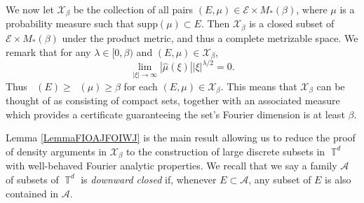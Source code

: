 \documentclass[dvipsnames,letterpaper,12pt]{article}
\numberwithin{equation}{section}
\DeclareMathOperator{\fordim}{\dim_{\mathbb{F}}}
\DeclareMathOperator{\TT}{\mathbb{T}}
\newtheorem{theorem}{Theorem}
\numberwithin{theorem}{section}
\begin{document}
We now let $\mathcal{X}_\beta$ be the collection of all pairs $(E,\mu) \in \mathcal{E} \times M_*(\beta)$, where $\mu$ is a probability measure such that $\text{supp}(\mu) \subset E$. Then $\mathcal{X}_\beta$ is a closed subset of $\mathcal{E} \times M_*(\beta)$ under the product metric, and thus a complete metrizable space. We remark that for any $\lambda \in [0,\beta)$ and $(E,\mu) \in \mathcal{X}_\beta$,
%
\begin{equation} \label{equationGFSCSC4}
    \lim_{|\xi| \to \infty} |\widehat{\mu}(\xi)| |\xi|^{\lambda/2} = 0.
\end{equation}
%
Thus $\fordim(E) \geq \fordim(\mu) \geq \beta$ for each $(E,\mu) \in \mathcal{X}_\beta$. This means that $\mathcal{X}_\beta$ can be thought of as consisting of compact sets, together with an associated measure which provides a certificate guaranteeing the set's Fourier dimension is at least $\beta$.

\begin{comment}
\begin{theorem}
    $\mathcal{X}$ is a closed subset of $\mathcal{E} \times M(\beta)$.
\end{theorem}
\begin{proof}
    Suppose $\{ (E_k,\mu_k) \}$ is a sequence of elements of $\mathcal{X}$ converging to some tuple $(E,\mu) \in \mathcal{E} \times M(\beta)$. Fix $\varepsilon > 0$. Since $E_k \to E$ in the Hausdorff dimension, there exists $k_0$ such that for $k \geq k_0$, $E_k \subset E(\varepsilon)$. Since $\mu_k \to \mu$ weakly, this implies that $\mu$ is a probability measure, and that $\text{supp}(\mu) \subset E(\varepsilon)$. Taking $\varepsilon \to 0$ shows that $\text{supp}(\mu) \subset E$. Again for a fixed $\varepsilon > 0$, applying the triangle inequality and the reverse triangle inequality combined with \eqref{equationGFSCSC4} applied to $\mu_k$, we conclude
    \[ \lim_{|\xi| \to \infty} |\xi|^{\beta/2 - \varepsilon} |\widehat{\mu}(\xi)| = \lim_{|\xi| \to \infty} |\xi|^{\beta/2 - \varepsilon} |\widehat{\mu}(\xi) - \widehat{\mu_k}(\xi)| \leq \| \mu - \mu_k \|_{M(\beta,\varepsilon)}. \]
    Taking $k \to \infty$ shows that
    \[ \lim_{|\xi| \to \infty} |\xi|^{\beta/2 - \varepsilon} |\widehat{\mu}(\xi)| = 0, \]
    which completes the proof.
\end{proof}
\end{comment}

Lemma \ref{LemmaFIOAJFOIWJ} is the main result allowing us to reduce the proof of density arguments in $\mathcal{X}_\beta$ to the construction of large discrete subsets in $\TT^d$ with well-behaved Fourier analytic properties. We recall that we say a family $\mathcal{A}$ of subsets of $\TT^d$ is \emph{downward closed} if, whenever $E \subset \mathcal{A}$, any subset of $E$ is also contained in $\mathcal{A}$.
\end{document}
